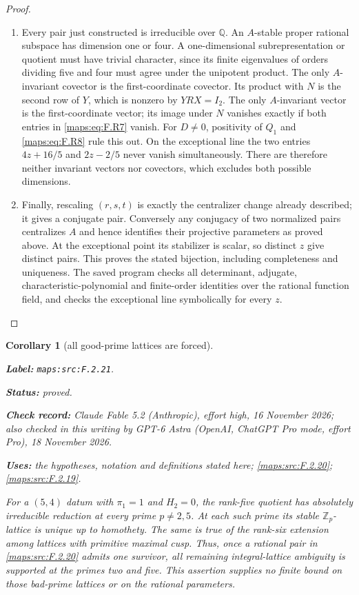 \documentclass[11pt,a4paper]{article}
\newtheorem{corollary}[corollary]{Corollary}
\theoremstyle{definition}
\newcommand{\StatementRecord}[4]{\par\smallskip\begingroup\upshape\raggedright\noindent\textbf{Label:} \nolinkurl{#1}.\par\noindent\textbf{Status:} #2.\par\noindent\textbf{Check record:} #3.\par\noindent\textbf{Uses:} #4.\par\endgroup\smallskip}
\newcommand{\CurrentChecker}{GPT-6 Astra (OpenAI, ChatGPT Pro mode, effort Pro), 18 November 2026}
\begin{document}
\begin{proof}
\begin{enumerate}[label=\arabic*.]
\item Every pair just constructed is irreducible over $\mathbb Q$.
An $A$-stable proper rational subspace has dimension one or
four.  A one-dimensional subrepresentation or quotient must
have trivial character, since its finite eigenvalues of
orders dividing five and four must agree under the
unipotent product.  The only $A$-invariant covector is the
first-coordinate covector.  Its product with $N$ is the
second row of $Y$, which is nonzero by $YRX=I_2$.
The only $A$-invariant vector is the first-coordinate vector;
its image under $N$ vanishes exactly if both entries in
\eqref{maps:eq:F.R7} vanish.  For $D\ne0$, positivity of $Q_1$ and
\eqref{maps:eq:F.R8} rule this out.  On the exceptional line the two
entries $4z+16/5$ and $2z-2/5$ never vanish simultaneously.
There are therefore neither invariant vectors nor covectors,
which excludes both possible dimensions.

\item Finally, rescaling $(r,s,t)$ is exactly the centralizer
change already described; it gives a conjugate pair.
Conversely any conjugacy of two normalized pairs centralizes
$A$ and hence identifies their projective parameters as proved
above.  At the exceptional point its stabilizer is scalar,
so distinct $z$ give distinct pairs.  This proves the stated
bijection, including completeness and uniqueness.
The saved program checks all determinant, adjugate,
characteristic-polynomial and finite-order identities over
the rational function field, and checks the exceptional
line symbolically for every $z$.

\end{enumerate}
\end{proof}




\begin{corollary}[all good-prime lattices are forced]\label{maps:src:F.2.21}
\StatementRecord{maps:src:F.2.21}{proved}{Claude Fable 5.2 (Anthropic), effort high, 16 November 2026; also checked in this writing by \CurrentChecker}{the hypotheses, notation and definitions stated here; \cref{maps:src:F.2.20}; \cref{maps:src:F.2.19}}


For a $(5,4)$ datum with $\pi_1=1$ and $H_2=0$, the
rank-five quotient has absolutely irreducible reduction
at every prime $p\ne2,5$.  At each such prime its stable
$\mathbb Z_p$-lattice is unique up to homothety.
The same is true of the rank-six extension among lattices
with primitive maximal cusp.  Thus, once a rational pair
in \ref{maps:src:F.2.20} admits one survivor, all remaining integral-lattice
ambiguity is supported at the primes two and five.
This assertion supplies no finite bound on those bad-prime
lattices or on the rational parameters.

\end{corollary}
\end{document}
